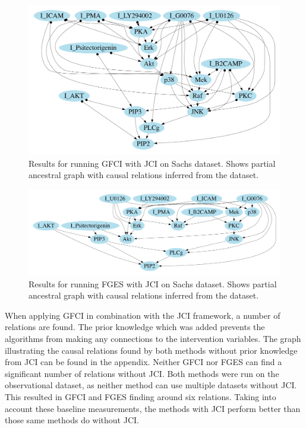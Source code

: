 \documentclass[a4paper,pdf]{article}
\begin{document}
\begin{figure}[!ht]
    \centering
    \includegraphics[width=\textwidth]{sachsGraph_bootstrap0_priorTRUEgfci}
    \caption{Results for running GFCI with JCI on Sachs dataset. Shows partial ancestral graph with causal relations inferred from the dataset.}
    \label{fig:sachsGFCIpag}
\end{figure}
\begin{figure}[!ht]
    \centering
    \includegraphics[width=\textwidth]{sachsGraph_bootstrap0_priorTRUEfges}
    \caption{Results for running FGES with JCI on Sachs dataset. Shows partial ancestral graph with causal relations inferred from the dataset.}
    \label{fig:sachsFGESpag}
\end{figure}

When applying GFCI in combination with the JCI framework, a number of relations are found. The prior knowledge which was added prevents the algorithms from making any connections to the intervention variables. The graph illustrating the causal relations found by both methods without prior knowledge from JCI can be found in the appendix. Neither GFCI nor FGES can find a significant number of relations without JCI. Both methods were run on the observational dataset, as neither method can use multiple datasets without JCI. This resulted in GFCI and FGES finding around six relations. Taking into account these baseline measurements, the methods with JCI perform better than those same methods do without JCI.
\end{document}
